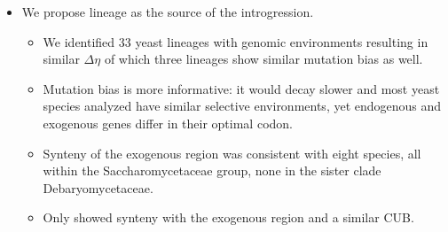 \documentclass[12pt]{article}
\begin{document}
\begin{itemize}
\begin{itemize}
	\end{itemize}

	\item We propose \gossypii lineage as the source of the introgression.
	\begin{itemize}
		\item We identified 33 yeast lineages with genomic environments resulting in similar $\Delta \eta$ of which three lineages show similar mutation bias as well.
		\item Mutation bias is more informative: it would decay slower and most yeast species analyzed have similar selective environments, yet endogenous and exogenous genes differ in their optimal codon.
		\item Synteny of the exogenous region was consistent with eight species, all within the Saccharomycetaceae group, none in the sister clade Debaryomycetaceae.
		\item Only \gossypii showed synteny with the exogenous region and a similar CUB.
	\end{itemize}


\end{itemize}
\end{document}
